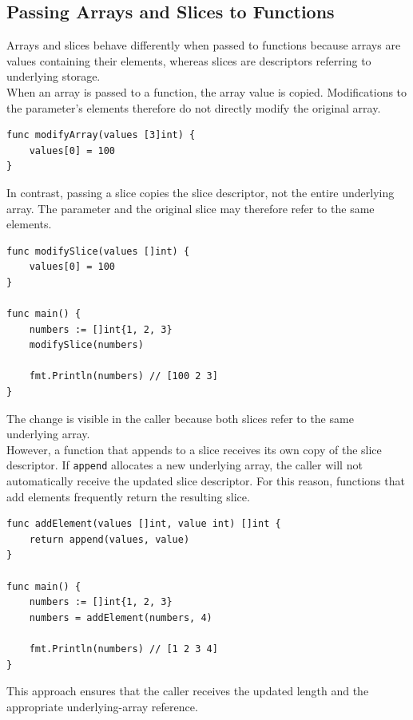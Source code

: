 \subsection{Passing Arrays and Slices to Functions}

Arrays and slices behave differently when passed to functions because arrays are values containing their elements, whereas slices are descriptors referring to underlying storage.\\

When an array is passed to a function, the array value is copied. Modifications to the parameter's elements therefore do not directly modify the original array.

\begin{lstlisting}
func modifyArray(values [3]int) {
    values[0] = 100
}
\end{lstlisting}

In contrast, passing a slice copies the slice descriptor, not the entire underlying array. The parameter and the original slice may therefore refer to the same elements.

\begin{lstlisting}
func modifySlice(values []int) {
    values[0] = 100
}

func main() {
    numbers := []int{1, 2, 3}
    modifySlice(numbers)

    fmt.Println(numbers) // [100 2 3]
}
\end{lstlisting}

The change is visible in the caller because both slices refer to the same underlying array.\\

However, a function that appends to a slice receives its own copy of the slice descriptor. If \texttt{append} allocates a new underlying array, the caller will not automatically receive the updated slice descriptor. For this reason, functions that add elements frequently return the resulting slice.

\begin{lstlisting}
func addElement(values []int, value int) []int {
    return append(values, value)
}

func main() {
    numbers := []int{1, 2, 3}
    numbers = addElement(numbers, 4)

    fmt.Println(numbers) // [1 2 3 4]
}
\end{lstlisting}

This approach ensures that the caller receives the updated length and the appropriate underlying-array reference.


